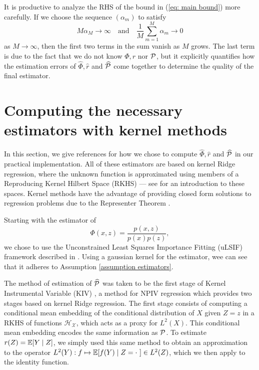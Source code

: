 It is productive to analyze the RHS of the bound in (\ref{eq: main bound}) more carefully.
If we choose the sequence $ ( \alpha_{ m } ) $ to satisfy
\begin{equation*}
    M \alpha_{ M } \to \infty \quad \text{and} \quad \frac{ 1 }{ M } \sum_{ m=1 }^{ M } \alpha_{ m } \to 0
\end{equation*}
as $ M \to \infty $, then the first two terms in the sum vanish as $ M $ grows.
The last term is due to the fact that we do not know $ \Phi, r $ nor $ \mathcal{P} $, but it explicitly quantifies how the estimation errors of $ \hat{ \Phi }, \hat{ r } $ and $ \widehat{ \mathcal{P} } $ come together to determine the quality of the final estimator.

\section{Computing the necessary estimators with kernel methods}
\label{sec: kernel methods}

In this section, we give references for how we chose to compute $ \hat{ \Phi }, \hat{ r } $ and $ \widehat{ \mathcal{P} } $ in our practical implementation.
All of these estimators are based on kernel Ridge regression, where the unknown function is approximated using members of a Reproducing Kernel Hilbert Space (RKHS) --- see \cite[Chapter~4]{svm2008} for an introduction to these spaces. 
Kernel methods have the advantage of providing closed form solutions to regression problems due to the Representer Theorem \cite[Theorem~1]{representer2001}.

Starting with the estimator of
\begin{equation*}
    \Phi ( x, z ) = \frac{ p ( x, z ) }{ p ( x ) p ( z ) }
,\end{equation*}
we chose to use the Unconstrained Least Squares Importance Fitting (uLSIF) framework described in \cite[Chapter~6]{sugiyama2012}.
Using a gaussian kernel for the estimator, wee can see that it adheres to Assumption \ref{assumption estimators}.

The method of estimation of $ \widehat{ \mathcal{P} } $ was taken to be the first stage of Kernel Instrumental Variable (KIV) \cite{singh2019}, a method for NPIV regression which provides two stages based on kernel Ridge regression.
The first stage consists of computing a conditional mean embedding \cite{cme2009} of the conditional distribution of $ X $ given $ Z = z $ in a RKHS of functions $ \mathcal{H}_{ \mathcal{X} } $, which acts as a proxy for $ L^2 ( X ) $.
This conditional mean embedding encodes the same information as $ \mathcal{P} $.
To estimate $ r ( Z ) = \mathbb{E} [ Y \mid Z ] $, we simply used this same method to obtain an approximation to the operator $ L^2 ( Y ) : f \mapsto \mathbb{E} [ f ( Y ) \mid Z = \cdot \ ] \in L^2 ( Z ) $, which we then apply to the identity function.


